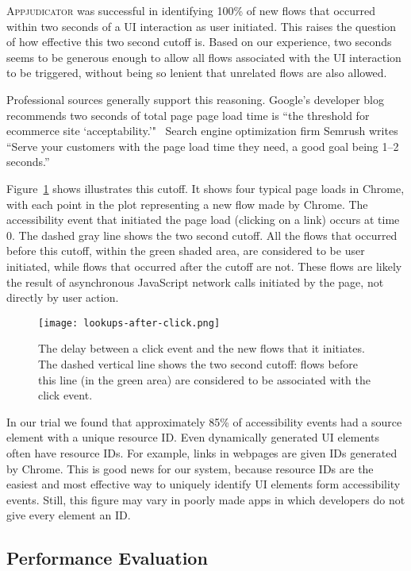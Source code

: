 \textsc{Appjudicator} was successful in identifying 100\% of new flows that
occurred within two seconds of a UI interaction as user initiated. This raises
the question of how effective this two second cutoff is. Based on our
experience, two seconds seems to be generous enough to allow all flows
associated with the UI interaction to be triggered, without being so lenient
that unrelated flows are also allowed.

Professional sources generally support this reasoning. Google's developer blog
recommends two seconds of total page page load time is ``the threshold for
ecommerce site `acceptability.'"~\cite{ohye2010} Search engine optimization firm
Semrush writes ``Serve your customers with the page load time they need, a good
goal being 1--2 seconds.''~\cite{bird2020}

Figure~\ref{fig:lookups-after-click} shows illustrates this cutoff. It shows
four typical page loads in Chrome, with each point in the plot representing a
new flow made by Chrome. The accessibility event that initiated the page load
(clicking on a link) occurs at time 0. The dashed gray line shows the two second
cutoff. All the flows that occurred before this cutoff, within the green shaded
area, are considered to be user initiated, while flows that occurred after the
cutoff are not. These flows are likely the result of asynchronous JavaScript
network calls initiated by the page, not directly by user action.

\begin{figure}[h]
    \centering
	\texttt{[image: lookups-after-click.png]}
	\caption{The delay between a click event and the new flows that it
		initiates. The dashed vertical line shows the two second cutoff: flows
		before this line (in the green area) are considered to be associated
		with the click event.}
	\label{fig:lookups-after-click}
\end{figure}

In our trial we found that approximately 85\% of accessibility events had a
source element with a unique resource ID. Even dynamically generated UI elements
often have resource IDs. For example, links in webpages are given IDs generated
by Chrome. This is good news for our system, because resource IDs are the
easiest and most effective way to uniquely identify UI elements form
accessibility events. Still, this figure may vary in poorly made apps in which
developers do not give every element an ID.

\subsection{Performance Evaluation}
\label{sec:performance-evaluation}

